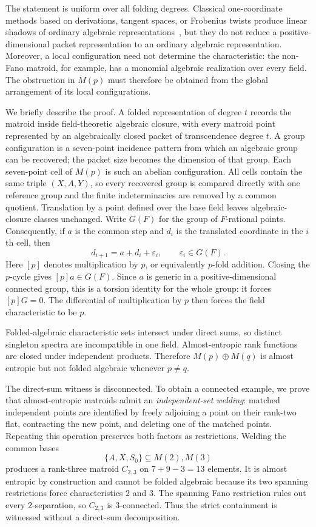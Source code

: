\documentclass[11pt]{article}
\theoremstyle{definition}
\begin{document}
The statement is uniform over all folding degrees.  Classical one-coordinate methods based on derivations, tangent spaces, or Frobenius twists produce linear shadows of ordinary algebraic representations~\cite{BollenDraismaPendavingh2018,CartwrightVarghese2024}, but they do not reduce a positive-dimensional packet representation to an ordinary algebraic representation.  Moreover, a local configuration need not determine the characteristic: the non-Fano matroid, for example, has a monomial algebraic realization over every field.  The obstruction in $M(p)$ must therefore be obtained from the global arrangement of its local configurations.

We briefly describe the proof.  A folded representation of degree $t$ records the matroid inside field-theoretic algebraic closure, with every matroid point represented by an algebraically closed packet of transcendence degree $t$.  A group configuration is a seven-point incidence pattern from which an algebraic group can be recovered; the packet size becomes the dimension of that group.  Each seven-point cell of $M(p)$ is such an abelian configuration.  All cells contain the same triple $(X,A,Y)$, so every recovered group is compared directly with one reference group and the finite indeterminacies are removed by a common quotient.  Translation by a point defined over the base field leaves algebraic-closure classes unchanged.  Write $G(F)$ for the group of $F$-rational points.  Consequently, if $a$ is the common step and $d_i$ is the translated coordinate in the $i$th cell, then
\[
d_{i+1}=a+d_i+\varepsilon_i,\qquad \varepsilon_i\in G(F).
\]
Here $[p]$ denotes multiplication by $p$, or equivalently $p$-fold addition.  Closing the $p$-cycle gives $[p]a\in G(F)$.  Since $a$ is generic in a positive-dimensional connected group, this is a torsion identity for the whole group: it forces $[p]G=0$.  The differential of multiplication by $p$ then forces the field characteristic to be $p$.

Folded-algebraic characteristic sets intersect under direct sums, so distinct singleton spectra are incompatible in one field.  Almost-entropic rank functions are closed under independent products.  Therefore $M(p)\oplus M(q)$ is almost entropic but not folded algebraic whenever $p\ne q$.

The direct-sum witness is disconnected.  To obtain a connected example, we prove that almost-entropic matroids admit an \emph{independent-set welding}: matched independent points are identified by freely adjoining a point on their rank-two flat, contracting the new point, and deleting one of the matched points.  Repeating this operation preserves both factors as restrictions.  Welding the common bases
\[
\{A,X,S_0\}\subseteq M(2),M(3)
\]
produces a rank-three matroid $C_{2,3}$ on $7+9-3=13$ elements.  It is almost entropic by construction and cannot be folded algebraic because its two spanning restrictions force characteristics $2$ and $3$.  The spanning Fano restriction rules out every $2$-separation, so $C_{2,3}$ is $3$-connected.  Thus the strict containment is witnessed without a direct-sum decomposition.
\end{document}
